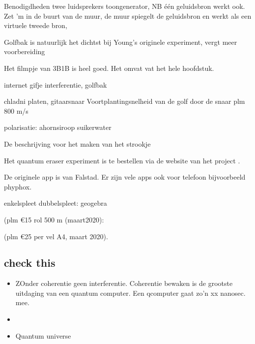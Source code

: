 \documentclass[../../main.tex]{subfiles}
\begin{document}
Benodigdheden twee luidsprekers toongenerator, NB \'e\'en geluidsbron werkt ook. Zet 'm in de buurt van de muur, de muur spiegelt de geluidsbron en werkt als een virtuele tweede bron, 

Golfbak is natuurlijk het dichtst bij Young's originele experiment, vergt meer voorbereiding

Het filmpje van 3B1B is heel goed. Het omvat vat het hele hoofdstuk.

internet gifje interferentie, golfbak

chladni platen, gitaarsnaar
Voortplantingsnelheid van de golf door de snaar plm 800 m/s

polarisatie: ahornsiroop suikerwater

De beschrijving voor het maken van het strookje 


Het quantum eraser experiment is te bestellen via de website van het project . 

De originele app is van Falstad. Er zijn vele apps ook voor telefoon bijvoorbeeld phyphox. 


enkelspleet dubbelspleet: geogebra 

 (plm \euro{15} rol 500 m (maart2020): 

 (plm \euro{25} per vel A4, maart 2020). 

%

\subsection*{check this}

\begin{itemize}
\item ZOnder coherentie geen interferentie. Coherentie bewaken is de grootste uitdaging van een quantum computer. Een qcomputer gaat zo'n xx nanosec. mee.
 
\item {}
\item {}
{Quantum universe}
\end{itemize}
\end{document}
